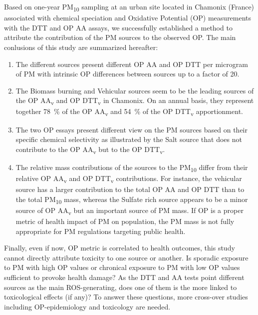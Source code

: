 \documentclass[acp, manuscript]{copernicus}
\begin{document}
Based on one-year PM\textsubscript{10} sampling at an urban site located in
Chamonix (France) associated with chemical speciation and Oxidative Potential
(OP) measurements with the DTT and OP AA assays, we successfully established a
method to attribute the contribution of the PM sources to the observed OP.
The main conlusions of this study are summarized hereafter:
\begin{enumerate}
    \item
        The different sources present different OP AA and OP DTT per microgram of PM
        with intrinsic OP differences between sources up to a factor of 20.
    \item
        The Biomass burning and Vehicular sources seem to be the leading sources of
        the OP AA\textsubscript{v} and OP DTT\textsubscript{v} in Chamonix. On an
        annual basis, they represent together 78~\% of the OP AA\textsubscript{v} and
        54~\% of the OP DTT\textsubscript{v} apportionment.
    \item
        The two OP essays present different view on the PM sources based on their
        specific chemical selectivity as illustrated by the Salt source that does not
        contribute to the OP AA\textsubscript{v} but to the OP DTT\textsubscript{v}.
    \item
        The relative mass contributions of the sources to the PM\textsubscript{10}
        differ from their relative OP AA\textsubscript{v} and OP DTT\textsubscript{v}
        contributions. For instance, the vehicular source has a larger contribution to
        the total OP AA and OP DTT than to the total PM\textsubscript{10} mass,
        whereas the Sulfate rich source appears to be a minor source of OP
        AA\textsubscript{v} but an important source of PM mass. If OP is a proper
        metric of health impact of PM on population, the PM mass is not fully
        appropriate for PM regulations targeting public health.
\end{enumerate}

Finally, even if now, OP metric is correlated to health outcomes, this study
cannot directly attribute toxicity to one source or another. Is sporadic
exposure to PM with high OP values or chronical exposure to PM with low OP
values sufficient to provoke health damage?  As the DTT and AA tests point
different sources as the main ROS-generating, does one of them is the more
linked to toxicological effects (if any)? To answer these questions, more
cross-over studies including OP-epidemiology and toxicology are needed.
\end{document}

